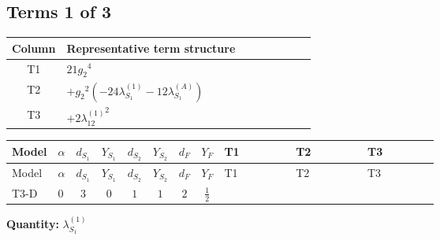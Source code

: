 \documentclass[8pt]{article}
\begin{document}
\begin{landscape}
\subsection*{Terms 1 of 3}
\begin{center}
\begin{tabular}{@{}c >{\raggedright\arraybackslash}p{0.82\linewidth}@{}}
\toprule
Column & Representative term structure \\
\midrule
T1 & \(\displaystyle 21 {g_2}^4\) \\
\midrule
T2 & \(\displaystyle +{g_2}^2 (-24 {\lambda_{S_1}^{(1)}}-12 {\lambda_{S_1}^{(A)}})\) \\
\midrule
T3 & \(\displaystyle +2 {\lambda_{12}^{(1)}}^2\) \\
\midrule
\bottomrule
\end{tabular}
\end{center}
\smallskip
\tiny
\begin{longtable}{@{}llcccccc >{\raggedright\arraybackslash}p{0.21\linewidth} >{\raggedright\arraybackslash}p{0.21\linewidth} >{\raggedright\arraybackslash}p{0.21\linewidth}@{}}
\toprule
Model & $\alpha$ & $d_{S_1}$ & $Y_{S_1}$ & $d_{S_2}$ & $Y_{S_2}$ & $d_F$ & $Y_F$ & T1 & T2 & T3 \\
\midrule
\endfirsthead
\toprule
Model & $\alpha$ & $d_{S_1}$ & $Y_{S_1}$ & $d_{S_2}$ & $Y_{S_2}$ & $d_F$ & $Y_F$ & T1 & T2 & T3 \\
\midrule
\endhead
T3-D & $0$ & $3$ & $0$ & $1$ & $1$ & $2$ & $\frac{1}{2}$ & \scriptsize\adjustbox{max width=\linewidth}{$\begin{gathered} 21 {g_2}^4\end{gathered}$} & \scriptsize\adjustbox{max width=\linewidth}{$\begin{gathered} +{g_2}^2 (-24 {\lambda_{S_1}^{(1)}}-12 {\lambda_{S_1}^{(A)}})\end{gathered}$} & \scriptsize\adjustbox{max width=\linewidth}{$\begin{gathered} +2 {\lambda_{12}^{(1)}}^2\end{gathered}$} \\
\midrule
\bottomrule
\end{longtable}
\clearpage
\noindent\textbf{Quantity: }$\lambda_{S_1}^{(1)}$\par\smallskip

\end{landscape}
\end{document}
